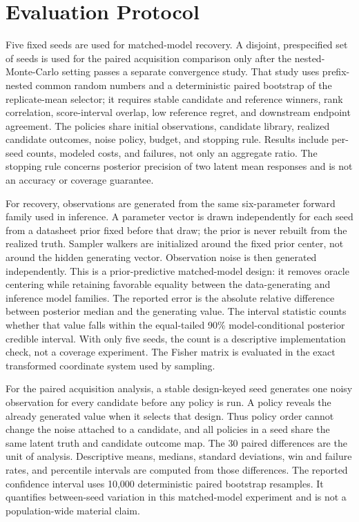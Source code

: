 \hypertarget{evaluation-protocol}{%
\section{Evaluation Protocol}\label{evaluation-protocol}}

Five fixed seeds are used for matched-model recovery. A disjoint,
prespecified set of seeds is used for the paired acquisition comparison
only after the nested-Monte-Carlo setting passes a separate convergence
study. That study uses prefix-nested common random numbers and a
deterministic paired bootstrap of the replicate-mean selector; it
requires stable candidate and reference winners, rank correlation,
score-interval overlap, low reference regret, and downstream endpoint
agreement. The policies share initial observations, candidate library,
realized candidate outcomes, noise policy, budget, and stopping rule.
Results include per-seed counts, modeled costs, and failures, not only
an aggregate ratio. The stopping rule concerns posterior precision of
two latent mean responses and is not an accuracy or coverage guarantee.

For recovery, observations are generated from the same six-parameter
forward family used in inference. A parameter vector is drawn
independently for each seed from a datasheet prior fixed before that
draw; the prior is never rebuilt from the realized truth. Sampler
walkers are initialized around the fixed prior center, not around the
hidden generating vector. Observation noise is then generated
independently. This is a prior-predictive matched-model design: it
removes oracle centering while retaining favorable equality between the
data-generating and inference model families. The reported error is the
absolute relative difference between posterior median and the generating
value. The interval statistic counts whether that value falls within the
equal-tailed 90\% model-conditional posterior credible interval. With
only five seeds, the count is a descriptive implementation check, not a
coverage experiment. The Fisher matrix is evaluated in the exact
transformed coordinate system used by sampling.

For the paired acquisition analysis, a stable design-keyed seed
generates one noisy observation for every candidate before any policy is
run. A policy reveals the already generated value when it selects that
design. Thus policy order cannot change the noise attached to a
candidate, and all policies in a seed share the same latent truth and
candidate outcome map. The 30 paired differences are the unit of
analysis. Descriptive means, medians, standard deviations, win and
failure rates, and percentile intervals are computed from those
differences. The reported confidence interval uses 10,000 deterministic
paired bootstrap resamples. It quantifies between-seed variation in this
matched-model experiment and is not a population-wide material claim.


